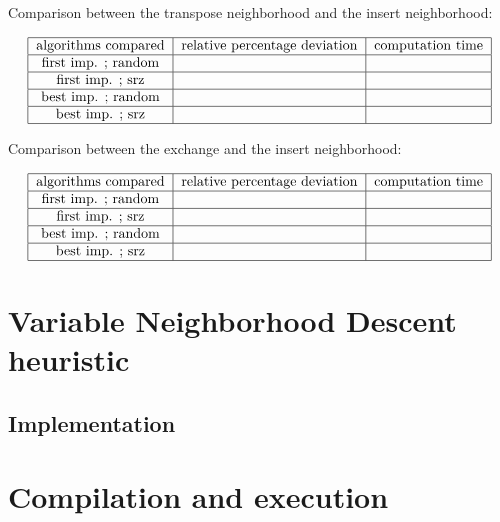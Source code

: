 \documentclass{article}
\begin{document}
Comparison between the transpose neighborhood and the insert neighborhood:

\begin{align*}
\begin{tabular} {|c|c|c|c|c|} \hline
    algorithms compared & relative percentage deviation & computation time \\ \hline
    first imp. ; random & & \\ \hline
    first imp. ; srz & & \\ \hline
    best imp. ; random & & \\ \hline
    best imp. ; srz & & \\ \hline
\end{tabular}
\end{align*}

Comparison between the exchange and the insert neighborhood:

\begin{align*}
\begin{tabular} {|c|c|c|c|c|} \hline
    algorithms compared & relative percentage deviation & computation time \\ \hline
    first imp. ; random & & \\ \hline
    first imp. ; srz & & \\ \hline
    best imp. ; random & & \\ \hline
    best imp. ; srz & & \\ \hline
\end{tabular}
\end{align*}

\section{Variable Neighborhood Descent heuristic}

\subsection{Implementation}

\section{Compilation and execution}
\end{document}
